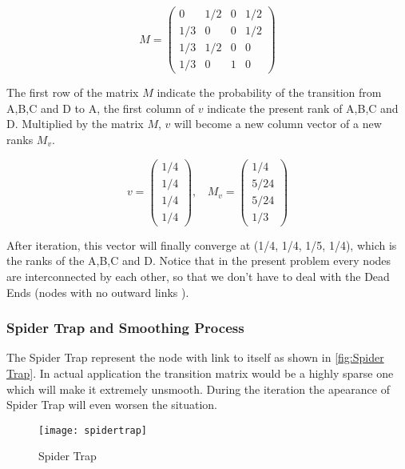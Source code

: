 \begin{equation}
M = 
\left( \begin{array}{cccc}
0 & 1/2 & 0 & 1/2 \\
1/3 & 0 & 0 & 1/2 \\
1/3 & 1/2 & 0 & 0 \\
1/3 & 0 & 1 & 0 
\end{array} \right)
\end{equation}
           
           
The first row of the matrix $M$ indicate the probability of the transition from A,B,C and D to A, the first column of $v$ indicate the present rank of A,B,C and D. Multiplied by the matrix $M$, $v$ will become a new column vector of a new ranks $M_v$.


\begin{equation}
v = \left( \begin{array}{c}
 1/4 \\
1/4 \\
1/4 \\
1/4 
\end{array} \right),\ \ \ \ 
M_v = 
\left( \begin{array}{c}
 1/4 \\
5/24 \\
5/24 \\
1/3 
\end{array} \right)
\end{equation}
           
           
After iteration, this vector will finally converge at (1/4, 1/4, 1/5, 1/4), which is the ranks of the A,B,C and D. Notice that in the present problem every nodes are interconnected by each other, so that we don't have to deal with the Dead Ends (nodes with no outward links ).

 
\subsubsection{Spider Trap and Smoothing Process}
The Spider Trap represent the node with link to itself as shown in \autoref{fig:Spider Trap}. In actual application the transition matrix would be a highly sparse one which will make it extremely unsmooth. During the iteration the apearance of Spider Trap will even worsen the situation.

\begin{figure}[ht]
\small
\centering
\texttt{[image: spidertrap]}
\caption{Spider Trap}
\label{fig:Spider Trap}
\end{figure}


